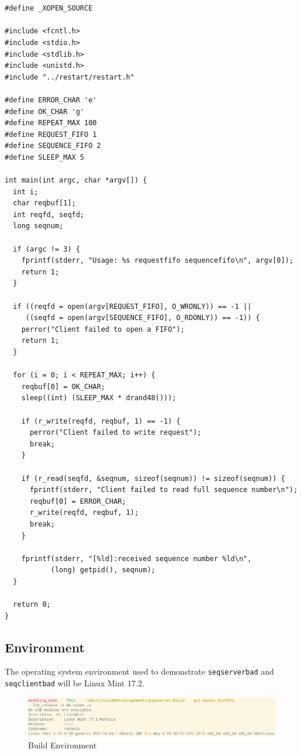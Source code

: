 \documentclass[letter,12pt,sffamily]{article}
\begin{document}
\begin{verbatim}
	
	
#define _XOPEN_SOURCE

#include <fcntl.h>
#include <stdio.h>
#include <stdlib.h>
#include <unistd.h>
#include "../restart/restart.h"

#define ERROR_CHAR 'e'
#define OK_CHAR 'g'
#define REPEAT_MAX 100
#define REQUEST_FIFO 1
#define SEQUENCE_FIFO 2
#define SLEEP_MAX 5

int main(int argc, char *argv[]) {
  int i;
  char reqbuf[1];
  int reqfd, seqfd;
  long seqnum;

  if (argc != 3) {
    fprintf(stderr, "Usage: %s requestfifo sequencefifo\n", argv[0]);
    return 1;
  }

  if ((reqfd = open(argv[REQUEST_FIFO], O_WRONLY)) == -1 ||
     ((seqfd = open(argv[SEQUENCE_FIFO], O_RDONLY)) == -1)) {
    perror("Client failed to open a FIFO");
    return 1;
  }
  
  for (i = 0; i < REPEAT_MAX; i++) {
    reqbuf[0] = OK_CHAR;
    sleep((int) (SLEEP_MAX * drand48()));
    
    if (r_write(reqfd, reqbuf, 1) == -1) {
      perror("Client failed to write request");
      break;
    }
	
    if (r_read(seqfd, &seqnum, sizeof(seqnum)) != sizeof(seqnum)) {
      fprintf(stderr, "Client failed to read full sequence number\n");
      reqbuf[0] = ERROR_CHAR;
      r_write(reqfd, reqbuf, 1);
      break;
    }

    fprintf(stderr, "[%ld]:received sequence number %ld\n",
           (long) getpid(), seqnum);
  }
	
  return 0;
}
\end{verbatim}
\subsection{Environment}
The operating system environment used to demonstrate \texttt{seqserverbad} and \texttt{seqclientbad} will be Linux Mint 17.2.
\begin{figure}[H]
	\centering
	\includegraphics[width=1\linewidth]{./images/0}
	\caption[env]{Build Environment}
	\label{fig:23}
\end{figure}
\end{document}
